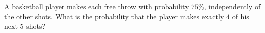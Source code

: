A basketball player makes each free throw with probability $75\%$, independently of the other shots. What is the probability that the player makes exactly $4$ of his next $5$ shots?

